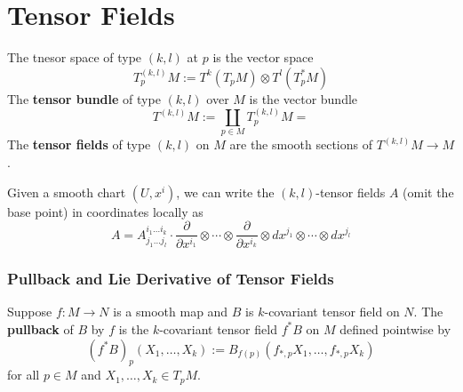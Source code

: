 \documentclass[12pt, oneside]{book}
\begin{document}
\section{Tensor Fields}
\begin{definition}
    The tnesor space of type $(k,l)$ at $p$ is the vector space
    \begin{equation*}
        T^{(k,l)}_p M
        :=
        T^k(T_p M) \otimes T^l\left(T_p^* M\right)
    \end{equation*}
    The \textbf{tensor bundle} of type $(k,l)$ over $M$ is the vector bundle
    \begin{equation*}
        T^{(k,l)}M
        :=
        \coprod_{p\in M} T^{(k,l)}_p M
        =
    \end{equation*}
    The \textbf{tensor fields} of type $(k,l)$ on $M$ are the smooth sections of $T^{(k,l)}M\to M$.
    \begin{remark}
        Given a smooth chart $\left(U,x^i\right)$, we can write the $(k,l)$-tensor fields $A$ (omit the base point) in coordinates locally as
        \begin{equation*}
            A
            =
            A^{i_1\ldots i_k}_{j_1\ldots j_l} \cdot \frac{\partial}{\partial x^{i_1}}\otimes \cdots \otimes \frac{\partial}{\partial x^{i_k}} \otimes dx^{j_1} \otimes \cdots \otimes dx^{j_l}
        \end{equation*}
    \end{remark}
\end{definition}


\subsubsection{Pullback and Lie Derivative of Tensor Fields}


\begin{definition}
    Suppose $f: M \rightarrow N$ is a smooth map and $B$ is $k$-covariant tensor field on $N$.
    The \textbf{pullback} of $B$ by $f$ is the $k$-covariant tensor field $f^* B$ on $M$ defined pointwise by
    \begin{equation*}
        (f^* B)_p\left(X_1, \ldots, X_k\right)
        :=
        B_{f(p)}\left(f_{*,p}X_1, \ldots, f_{*,p}X_k\right)
    \end{equation*}
    for all $p \in M$ and $X_1, \ldots, X_k \in T_p M$.
\end{definition}
\end{document}
